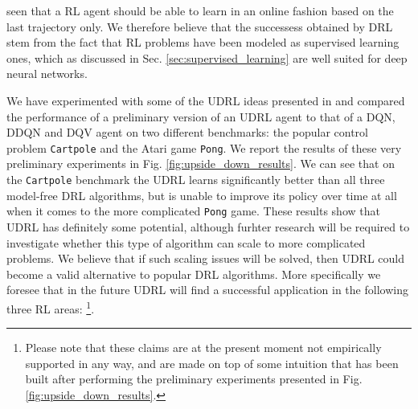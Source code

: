 seen that a RL agent should be able to learn in an online fashion based on the last trajectory only. We therefore believe that the successess obtained by DRL stem from the fact that RL problems have been modeled as supervised learning ones, which as discussed in Sec. \ref{sec:supervised_learning} are well suited for deep neural networks.

We have experimented with some of the UDRL ideas presented in \cite{schmidhuber2019reinforcement,srivastava2019training} and compared the performance of a preliminary version of an UDRL agent to that of a DQN, DDQN and DQV agent on two different benchmarks: the popular control problem \texttt{Cartpole} and the Atari game \texttt{Pong}. We report the results of these very preliminary experiments in Fig. \ref{fig:upside_down_results}. We can see that on the \texttt{Cartpole} benchmark the UDRL learns significantly better than all three model-free DRL algorithms, but is unable to improve its policy over time at all when it comes to the more complicated \texttt{Pong} game. These results show that UDRL has definitely some potential, although furhter research will be required to investigate whether this type of algorithm can scale to more complicated problems. We believe that if such scaling issues will be solved, then UDRL could become a valid alternative to popular DRL algorithms. More specifically we foresee that in the future UDRL will find a successful application in the following three RL areas: \footnote{Please note that these claims are at the present moment not empirically supported in any way, and are made on top of some intuition that has been built after performing the preliminary experiments presented in Fig. \ref{fig:upside_down_results}.}.



